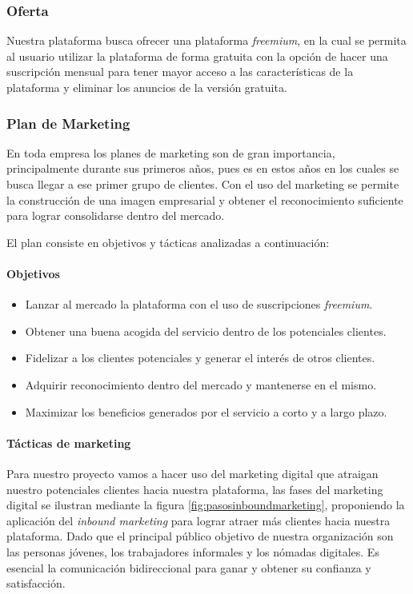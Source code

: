 \subsubsection*{Oferta}
Nuestra plataforma busca ofrecer una plataforma \textit{freemium}, en la cual se permita al usuario utilizar la plataforma de forma gratuita con la opción de hacer una suscripción mensual para tener mayor acceso a las características de la plataforma y eliminar los anuncios de la versión gratuita.

\subsubsection*{Plan de Marketing}
En toda empresa los planes de marketing son de gran importancia, principalmente durante sus primeros años, pues es en estos años en los cuales se busca llegar a ese primer grupo de clientes. Con el uso del marketing se permite la construcción de una imagen empresarial y obtener el reconocimiento suficiente para lograr consolidarse dentro del mercado.

El plan consiste en objetivos y tácticas analizadas a continuación:

\paragraph*{Objetivos}

\begin{itemize}
	\item Lanzar al mercado la plataforma con el uso de suscripciones \textit{freemium}.
	
	\item Obtener una buena acogida del servicio dentro de los potenciales clientes.
	
	\item Fidelizar a los clientes potenciales y generar el interés de otros clientes.
	
	\item Adquirir reconocimiento dentro del mercado y mantenerse en el mismo.
	
	\item Maximizar los beneficios generados por el servicio a corto y a largo plazo.
\end{itemize}

\paragraph*{Tácticas de marketing}
Para nuestro proyecto vamos a hacer uso del marketing digital que atraigan nuestro potenciales clientes hacia nuestra plataforma, las fases del marketing digital se ilustran mediante la figura \ref{fig:pasosinboundmarketing}, proponiendo la aplicación del \textit{inbound marketing} para lograr atraer más clientes hacia nuestra plataforma. Dado que el principal público objetivo de nuestra organización son las personas jóvenes, los trabajadores informales y los nómadas digitales. Es esencial la comunicación bidireccional para ganar y obtener su confianza y satisfacción. 

